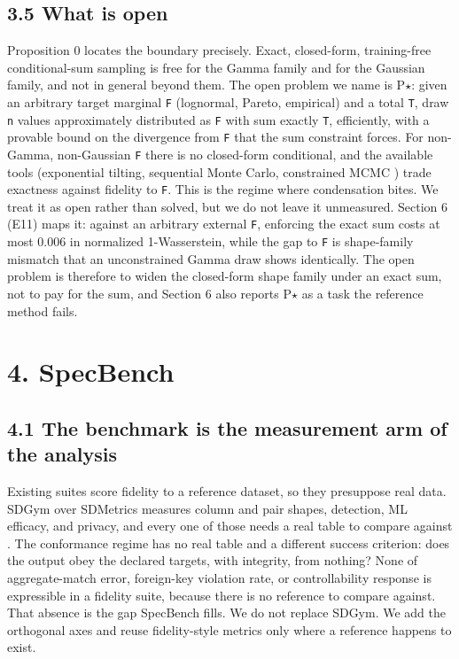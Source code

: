 \hypertarget{what-is-open}{%
\subsection{3.5 What is open}\label{what-is-open}}

Proposition 0 locates the boundary precisely. Exact, closed-form,
training-free conditional-sum sampling is free for the Gamma family and
for the Gaussian family, and not in general beyond them. The open
problem we name is P\ensuremath{\star}: given an arbitrary target
marginal \texttt{F} (lognormal, Pareto, empirical) and a total
\texttt{T}, draw \texttt{n} values approximately distributed as
\texttt{F} with sum exactly \texttt{T}, efficiently, with a provable
bound on the divergence from \texttt{F} that the sum constraint forces.
For non-Gamma, non-Gaussian \texttt{F} there is no closed-form
conditional, and the available tools (exponential tilting, sequential
Monte Carlo, constrained MCMC \cite{golchi2016scmc}) trade exactness
against fidelity to \texttt{F}. This is the regime where condensation
bites. We treat it as open rather than solved, but we do not leave it
unmeasured. Section 6 (E11) maps it: against an arbitrary external
\texttt{F}, enforcing the exact sum costs at most 0.006 in normalized
1-Wasserstein, while the gap to \texttt{F} is shape-family mismatch that
an unconstrained Gamma draw shows identically. The open problem is
therefore to widen the closed-form shape family under an exact sum, not
to pay for the sum, and Section 6 also reports P\ensuremath{\star} as a
task the reference method fails.

\hypertarget{specbench}{%
\section{4. SpecBench}\label{specbench}}

\hypertarget{the-benchmark-is-the-measurement-arm-of-the-analysis}{%
\subsection{4.1 The benchmark is the measurement arm of the
analysis}\label{the-benchmark-is-the-measurement-arm-of-the-analysis}}

Existing suites score fidelity to a reference dataset, so they
presuppose real data. SDGym over SDMetrics measures column and pair
shapes, detection, ML efficacy, and privacy, and every one of those
needs a real table to compare against \cite{sdgym}. The conformance
regime has no real table and a different success criterion: does the
output obey the declared targets, with integrity, from nothing? None of
aggregate-match error, foreign-key violation rate, or controllability
response is expressible in a fidelity suite, because there is no
reference to compare against. That absence is the gap SpecBench fills.
We do not replace SDGym. We add the orthogonal axes and reuse
fidelity-style metrics only where a reference happens to exist.

